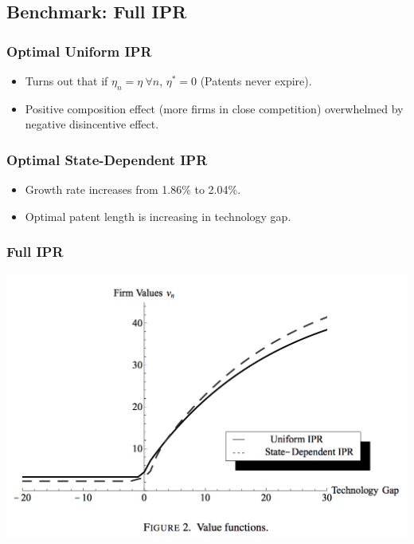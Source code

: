 \documentclass{beamer}
\begin{document}
\subsection{Benchmark: Full IPR}
\label{sub:benchmark_full_ipr}
\begin{frame}[t]\frametitle{Optimal Uniform IPR} 
  \begin{itemize}
    \item<+-> Turns out that if $\eta_n = \eta \ \forall n$, $\eta^* = 0$ (Patents never expire).
    \item<+-> Positive composition effect (more firms in close competition) overwhelmed by negative disincentive effect.
  \end{itemize}
\end{frame}

\begin{frame}[t]\frametitle{Optimal State-Dependent IPR} 
  \begin{itemize}
    \item<+-> Growth rate increases from 1.86\% to 2.04\%.
    \item<+-> Optimal patent length is increasing in technology gap. 
  \end{itemize}
\end{frame}

\begin{frame}[t]\frametitle{Full IPR} 
  \begin{center}
    \includegraphics[scale=.31]{full_ipr_value.png}
    \label{fig:full_ipr}
  \end{center}
\end{frame}
\end{document}
